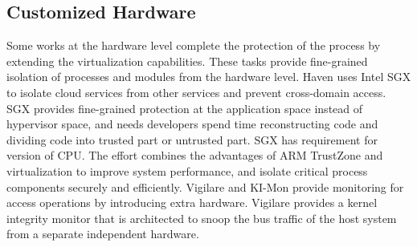 \documentclass[conference]{IEEEtran}
\begin{document}

\subsection{Customized Hardware }
Some works at the hardware level complete the protection of the process by extending the virtualization capabilities. These tasks provide fine-grained isolation of processes and modules from the hardware level. Haven \cite{haven} uses Intel SGX\cite{Hoekstra13cuvillo,Mckeen2013Innovative} to isolate cloud services from other services and prevent cross-domain access. SGX provides fine-grained protection at the application space instead of hypervisor space, and needs developers spend time reconstructing code and dividing code into trusted part or untrusted part. SGX has requirement for version of CPU. The effort \cite{Cho2016Hardware} combines the advantages of ARM TrustZone and virtualization to improve system performance, and isolate critical process components securely and efficiently.
 Vigilare\cite{Moon2012Vigilare} and KI-Mon \cite{Lee2013KI} provide monitoring for access operations by introducing extra hardware. Vigilare provides a kernel integrity monitor that is architected to snoop the bus traffic of the host system from a separate independent hardware.
\end{document}
